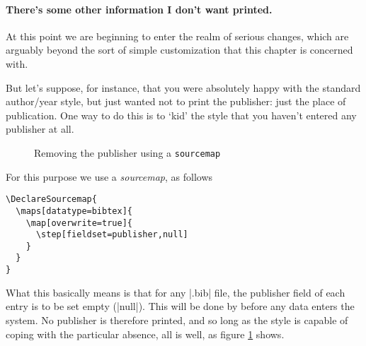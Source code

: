 \paragraph{There's some other information I don't want printed.} At
this point we are beginning to enter the realm of serious changes,
which are arguably beyond the sort of simple customization that this
chapter is concerned with.

But let's suppose, for instance, that you were absolutely happy with
the standard author/year style, but just wanted not to print the
publisher: just the place of publication. One way to do this is to
`kid' the style that you haven't entered any publisher at all.
\begin{figure}
\vspace{0.5\baselineskip}

\caption{Removing the publisher using a \texttt{sourcemap}\label{punctcite12}}
\end{figure}

For this purpose we use a \emph{sourcemap}, as follows

\begin{minipage}{\textwidth}
\begin{Verbatim}
\DeclareSourcemap{
  \maps[datatype=bibtex]{
    \map[overwrite=true]{
      \step[fieldset=publisher,null]
    }
  }
}
\end{Verbatim}
\end{minipage}

\vspace{1ex}
What this basically means is that for any |.bib| file, the publisher
field of each entry is to be set empty (|null|). This will be done by
 before any data enters the system. No publisher is
therefore printed, and so long as the style is capable of coping with
the particular absence, all is well, as figure \ref{punctcite12}
shows.

